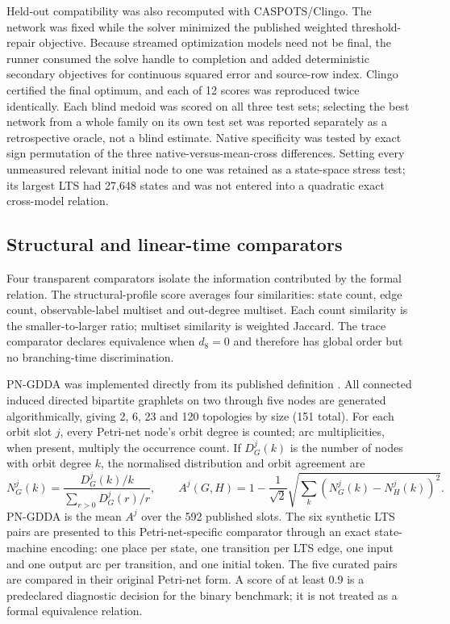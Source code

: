 \documentclass[pdflatex,sn-mathphys-ay]{sn-jnl}
\theoremstyle{definition}
\begin{document}
Held-out compatibility was also recomputed with CASPOTS/Clingo. The network was
fixed while the solver minimized the published weighted threshold-repair
objective. Because streamed optimization models need not be final, the runner
consumed the solve handle to completion and added deterministic secondary
objectives for continuous squared error and source-row index. Clingo certified
the final optimum, and each of 12 scores was reproduced twice identically. Each
blind medoid was scored on all three test sets; selecting the best network from a
whole family on its own test set was reported separately as a retrospective
oracle, not a blind estimate. Native specificity was tested by exact sign
permutation of the three native-versus-mean-cross differences. Setting every
unmeasured relevant initial node to one was retained as a state-space stress test;
its largest LTS had 27,648 states and was not entered into a quadratic exact
cross-model relation.

\subsection{Structural and linear-time comparators}\label{sec:baselines}

Four transparent comparators isolate the information contributed by the formal
relation. The structural-profile score averages four similarities: state count,
edge count, observable-label multiset and out-degree multiset. Each count
similarity is the smaller-to-larger ratio; multiset similarity is weighted
Jaccard. The trace comparator declares equivalence when $d_8=0$ and therefore
has global order but no branching-time discrimination.

PN-GDDA was implemented directly from its published definition
\citep{Szawulak2022}. All connected induced directed bipartite graphlets on two
through five nodes are generated algorithmically, giving 2, 6, 23 and 120
topologies by size (151 total). For each orbit slot $j$, every Petri-net node's
orbit degree is counted; arc multiplicities, when present, multiply the
occurrence count. If $D_G^j(k)$ is the number of nodes with orbit degree $k$, the
normalised distribution and orbit agreement are
\begin{equation}
N_G^j(k)=\frac{D_G^j(k)/k}{\sum_{r>0}D_G^j(r)/r},\qquad
A^j(G,H)=1-\frac{1}{\sqrt{2}}
\sqrt{\sum_k\left(N_G^j(k)-N_H^j(k)\right)^2}.
\end{equation}
PN-GDDA is the mean $A^j$ over the 592 published slots. The six synthetic LTS
pairs are presented to this Petri-net-specific comparator through an exact
state-machine encoding: one place per state, one transition per LTS edge, one
input and one output arc per transition, and one initial token. The five curated
pairs are compared in their original Petri-net form. A score of at least 0.9 is
a predeclared diagnostic decision for the binary benchmark; it is not treated as
a formal equivalence relation.
\end{document}
